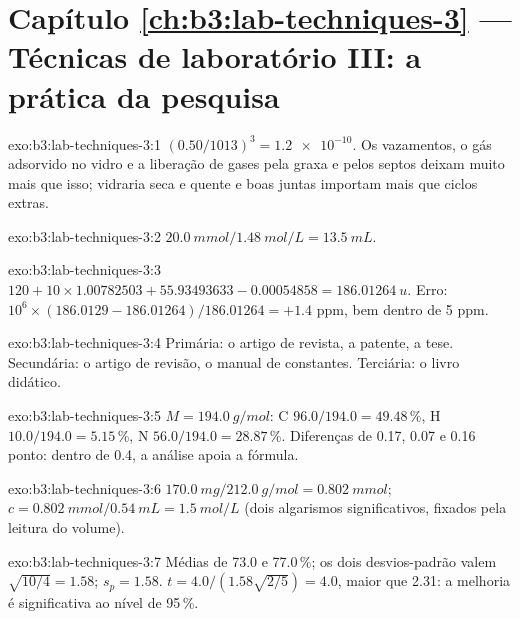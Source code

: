 \section*{Capítulo \ref{ch:b3:lab-techniques-3} --- Técnicas de laboratório III: a prática da pesquisa}

\begin{solution}{exo:b3:lab-techniques-3:1}
$(0.50/1013)^3 = \num{1.2e-10}$. Os vazamentos, o gás adsorvido no vidro e a liberação de gases pela graxa e pelos septos
deixam muito mais que isso; vidraria seca e quente e boas juntas importam mais que
ciclos extras.
\end{solution}

\begin{solution}{exo:b3:lab-techniques-3:2}
$\qty{20.0}{mmol}/\qty{1.48}{mol/L} = \qty{13.5}{mL}$.
\end{solution}

\begin{solution}{exo:b3:lab-techniques-3:3}
$120 + 10 \times 1.00782503 + 55.93493633 - 0.00054858 = \qty{186.01264}{u}$. Erro: $10^6 \times (186.0129 - 186.01264)/186.01264 = +1.4$ ppm,
bem dentro de 5 ppm.
\end{solution}

\begin{solution}{exo:b3:lab-techniques-3:4}
Primária: o artigo de revista, a patente, a tese. Secundária: o artigo de revisão, o
manual de constantes. Terciária: o livro didático.
\end{solution}

\begin{solution}{exo:b3:lab-techniques-3:5}
$M = \qty{194.0}{g/mol}$: C $96.0/194.0 = 49.48$\,\%, H $10.0/194.0 = 5.15$\,\%, N $56.0/194.0 = 28.87$\,\%. Diferenças de 0.17, 0.07 e 0.16
ponto: dentro de 0.4, a análise apoia a fórmula.
\end{solution}

\begin{solution}{exo:b3:lab-techniques-3:6}
$\qty{170.0}{mg}/\qty{212.0}{g/mol} = \qty{0.802}{mmol}$; $c = \qty{0.802}{mmol}/\qty{0.54}{mL} = \qty{1.5}{mol/L}$ (dois algarismos significativos, fixados pela
leitura do volume).
\end{solution}

\begin{solution}{exo:b3:lab-techniques-3:7}
Médias de 73.0 e 77.0\,\%; os dois desvios-padrão valem $\sqrt{10/4} = 1.58$; $s_p = 1.58$. $t = 4.0/(1.58\sqrt{2/5}) = 4.0$, maior que
2.31: a melhoria é significativa ao nível de 95\,\%.
\end{solution}

